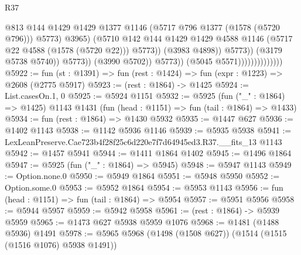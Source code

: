 \begin{lexlean}{R37}
\begin{coremodule}
                                                      @813
                                                      @144
                                                      @1429
                                                      @1429
                                                      @1377
                                                      @1146
                                                      (@5717 @796 @1377 (@1578 (@5720 @796)))
                                                      @5773)
                                                    @3965)
                                                  (@5710
                                                    @142
                                                    @144
                                                    @1429
                                                    @1429
                                                    @4588
                                                    @1146
                                                    (@5717 @22 @4588 (@1578 (@5720 @22)))
                                                    @5773))
                                                (@3983 @4898))
                                              @5773))
                                          (@3179 @5738 @5740))
                                        @5773))
                                    (@3990 @5702))
                                  @5773))
                              (@5045 @5571))))))))))))))
@5922 := fun (st : @1391) => fun (rest : @1424) => fun (expr : @1223) => @2608 (@2775 @5917)
@5923 := (rest : @1864) -> @1425
@5924 := List.casesOn.{1, 0}
@5925 := @5924 @1151
@5932 := @5925
    (fun ("_" : @1864) => @1425)
    @1143
    @1431
    (fun (head : @1151) => fun (tail : @1864) => @1433)
@5934 := fun (rest : @1864) => @1430 @5932
@5935 := @1447 @627
@5936 := @1402 @1143
@5938 := @1142 @5936 @1146
@5939 := @5935 @5938
@5941 := LexLeanPreserve.Cae723b4f28f25c6d220e7f7d64945ed3.R37.__fits_13 @1143
@5942 := @1457 @5941
@5944 := @1411 @1864 @1402
@5945 := @1496 @1864
@5947 := @5925 (fun ("_" : @1864) => @5945)
@5948 := @5947 @1143
@5949 := Option.none.{0}
@5950 := @5949 @1864
@5951 := @5948 @5950
@5952 := Option.some.{0}
@5953 := @5952 @1864
@5954 := @5953 @1143
@5956 := fun (head : @1151) => fun (tail : @1864) => @5954
@5957 := @5951 @5956
@5958 := @5944 @5957
@5959 := @5942 @5958
@5961 := (rest : @1864) -> @5939 @5959
@5965 := @1473 @627 @5938 @5959 @1076
@5968 := @1481 (@1488 @5936) @1491
@5978 := @5965 @5968 (@1498 (@1508 @627)) (@1514 (@1515 (@1516 @1076) @5938 @1491))

\end{coremodule}
\end{lexlean}
